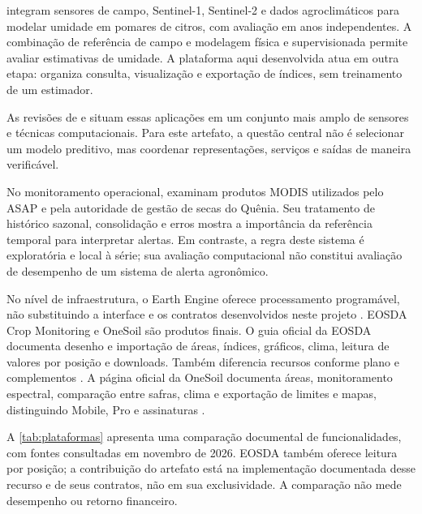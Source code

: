 \citet{IZQUIERDO2026} integram sensores de campo, Sentinel-1, Sentinel-2 e dados agroclimáticos para modelar umidade em pomares de citros, com avaliação em anos independentes. A combinação de referência de campo e modelagem física e supervisionada permite avaliar estimativas de umidade. A plataforma aqui desenvolvida atua em outra etapa: organiza consulta, visualização e exportação de índices, sem treinamento de um estimador.

As revisões de \citet{WEISS2020} e \citet{PATRICIO2018} situam essas aplicações em um conjunto mais amplo de sensores e técnicas computacionais. Para este artefato, a questão central não é selecionar um modelo preditivo, mas coordenar representações, serviços e saídas de maneira verificável.

No monitoramento operacional, \citet{MERONI2019} examinam produtos MODIS utilizados pelo ASAP e pela autoridade de gestão de secas do Quênia. Seu tratamento de histórico sazonal, consolidação e erros mostra a importância da referência temporal para interpretar alertas. Em contraste, a regra deste sistema é exploratória e local à série; sua avaliação computacional não constitui avaliação de desempenho de um sistema de alerta agronômico.

No nível de infraestrutura, o Earth Engine oferece processamento programável, não substituindo a interface e os contratos desenvolvidos neste projeto \citep{GORELICK2017}. EOSDA Crop Monitoring e OneSoil são produtos finais. O guia oficial da EOSDA documenta desenho e importação de áreas, índices, gráficos, clima, leitura de valores por posição e downloads. Também diferencia recursos conforme plano e complementos \citep{EOSDA_GUIDE}. A página oficial da OneSoil documenta áreas, monitoramento espectral, comparação entre safras, clima e exportação de limites e mapas, distinguindo Mobile, Pro e assinaturas \citep{ONESOIL_PLATFORM_DETAIL}.

A \cref{tab:plataformas} apresenta uma comparação documental de funcionalidades, com fontes consultadas em novembro de 2026. EOSDA também oferece leitura por posição; a contribuição do artefato está na implementação documentada desse recurso e de seus contratos, não em sua exclusividade. A comparação não mede desempenho ou retorno financeiro.

